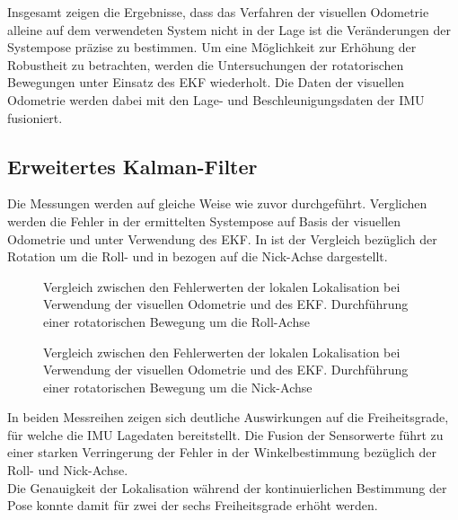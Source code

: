 Insgesamt zeigen die Ergebnisse, dass das Verfahren der visuellen Odometrie alleine auf dem verwendeten System nicht in der Lage ist die Veränderungen der Systempose präzise zu bestimmen. Um eine Möglichkeit zur Erhöhung der Robustheit zu betrachten, werden die Untersuchungen der rotatorischen Bewegungen unter Einsatz des EKF wiederholt. Die Daten der visuellen Odometrie werden dabei mit den Lage- und Beschleunigungsdaten der IMU fusioniert.\\

\subsection{Erweitertes Kalman-Filter}
Die Messungen werden auf gleiche Weise wie zuvor durchgeführt. Verglichen werden die Fehler in der ermittelten Systempose auf Basis der visuellen Odometrie und unter Verwendung des EKF. In  ist der Vergleich bezüglich der Rotation um die Roll- und in  bezogen auf die Nick-Achse dargestellt.


\begin{figure}

\caption{Vergleich zwischen den Fehlerwerten der lokalen Lokalisation bei Verwendung der visuellen Odometrie und des EKF. Durchführung einer rotatorischen Bewegung um die Roll-Achse}
\label{fig.loc_loc_rot_ekf_roll}
\end{figure}

\begin{figure}

\caption{Vergleich zwischen den Fehlerwerten der lokalen Lokalisation bei Verwendung der visuellen Odometrie und des EKF. Durchführung einer rotatorischen Bewegung um die Nick-Achse}
\label{fig.loc_loc_rot_ekf_pitch}
\end{figure}


In beiden Messreihen zeigen sich deutliche Auswirkungen auf die Freiheitsgrade, für welche die IMU Lagedaten bereitstellt. Die Fusion der Sensorwerte führt zu einer starken Verringerung der Fehler in der Winkelbestimmung bezüglich der Roll- und Nick-Achse.\\
Die Genauigkeit der Lokalisation während der kontinuierlichen Bestimmung der Pose konnte damit für zwei der sechs Freiheitsgrade erhöht werden.\\

